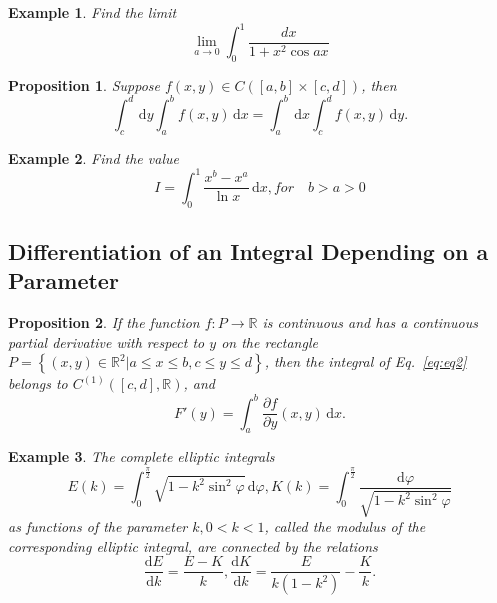 \documentclass[a4paper,12pt]{article}
\newtheorem{example}{Example}             %
\newtheorem{proposition}{Proposition}
\begin{document}
\begin{CJK}{UTF8}{gbsn}
    \begin{example}
        Find the limit 
        \[
            \lim_{a \to 0} \int_0^1\frac{dx}{1+x^2\cos ax}
        \]
    \end{example}

    \begin{proposition}
        Suppose $f(x,y) \in C\left([a,b]\times[c,d]\right)$, then 
        \[
            \int_c^d\,\mathrm{d}y\int_a^bf(x,y)\,\mathrm{d}x  = 
            \int_a^b\,\mathrm{d}x\int_c^df(x,y)\,\mathrm{d}y.
        \]
    \end{proposition}

    \begin{example}
        Find the value 
        \[
            I = \int_0^1\frac{x^b-x^a}{\ln x}\, \mathrm{d}x, for\quad b > a > 0
            \]
    \end{example}

    \subsection{Differentiation of an Integral Depending on a Parameter}
    \begin{proposition}
        If the function $f: P \to \mathbb{R}$ is continuous and has a continuous 
        partial derivative with respect to $y$ on the rectangle $P = \left\{ \left(x,y\right)
        \in \mathbb{R}^2 \vert a \le x \le b, c \le y \le d\right\}$, then the integral 
        of Eq.~\ref{eq:eq2} belongs to $C^{(1)}\left([c,d],\mathbb{R}\right)$, and 
        \[
            F'(y) = \int_a^b\frac{\partial f}{\partial y}(x,y)\, \mathrm{d}x.
        \]
    \end{proposition}

    \begin{example}
        The complete elliptic integrals
        \[
            E(k) = \int_0^{\frac{\pi}{2}}\sqrt{1-k^2\sin^2\varphi}\, \mathrm{d}\varphi,
            K(k) = \int_0^{\frac{\pi}{2}}\frac{\mathrm{d}\varphi}{\sqrt{1-k^2\sin^2\varphi}}
        \]
    as functions of the parameter $k, 0 < k < 1$, called the modulus of the 
    corresponding elliptic integral, are connected by the relations
        \[
            \frac{\mathrm{d}E}{\mathrm{d}k} = \frac{E - K}{k},
            \frac{\mathrm{d}K}{\mathrm{d}k} = \frac{E}{k(1-k^2)} - \frac{K}{k}.
        \]
    \end{example}


\end{CJK}
\end{document}
